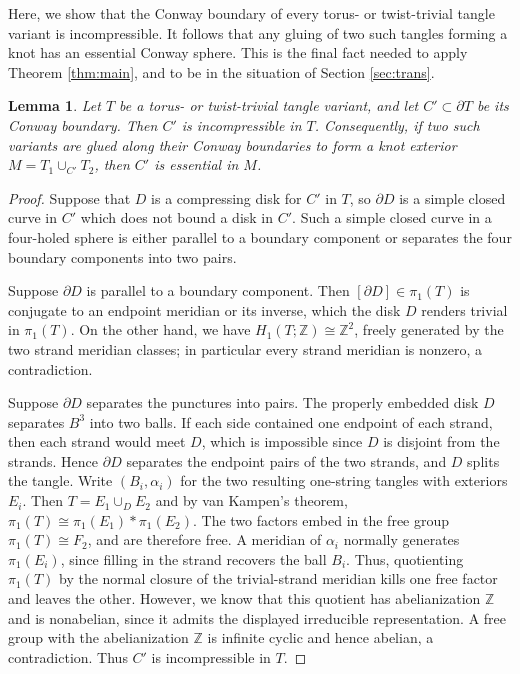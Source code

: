 \documentclass{article}
\theoremstyle{plain}
\theoremstyle{definition}
\theoremstyle{plain}
\theoremstyle{plain}
\theoremstyle{plain}
\newtheorem{lemma}[theorem]{Lemma}
\theoremstyle{remark}
\theoremstyle{remark}
\theoremstyle{plain}
\theoremstyle{plain}
\newcounter{main}
\theoremstyle{plain}
\theoremstyle{plain}
\begin{document}
Here, we show that the Conway boundary of every torus- or twist-trivial tangle variant is incompressible. It follows that any gluing of two such tangles forming a knot has an essential Conway sphere. This is the final fact needed to apply Theorem \ref{thm:main}, and to be in the situation of Section \ref{sec:trans}. 

\begin{lemma}\label{lma:essential}
Let $T$ be a torus- or twist-trivial tangle variant, and let $C' \subset \partial T$ be its Conway boundary. Then $C'$ is incompressible in $T$. Consequently, if two such variants are glued along their Conway boundaries to form a knot exterior $M = T_1 \cup_{C'}T_2$, then $C'$ is essential in $M$. 
\end{lemma}

\begin{proof}
Suppose that $D$ is a compressing disk for $C'$ in $T$, so $\partial D$ is a simple closed curve in $C'$ which does not bound a disk in $C'$. Such a simple closed curve in a four-holed sphere is either parallel to a boundary component or separates the four boundary components into two pairs. 

\medskip

Suppose $\partial D$ is parallel to a boundary component. Then $[\partial D] \in \pi_1(T)$ is conjugate to an endpoint meridian or its inverse, which the disk $D$ renders trivial in $\pi_1(T)$. On the other hand, we have $H_1(T; \mathbb{Z}) \cong \mathbb{Z}^2$, freely generated by the two strand meridian classes; in particular every strand meridian is nonzero, a contradiction. 

\medskip

Suppose $\partial D$ separates the punctures into pairs. The properly embedded disk $D$ separates $B^3$ into two balls. If each side contained one endpoint of each strand, then each strand would meet $D$, which is impossible since $D$ is disjoint from the strands. Hence $\partial D$ separates the endpoint pairs of the two strands, and $D$ splits the tangle. Write $(B_i, \alpha_i)$ for the two resulting one-string tangles with exteriors $E_i$. Then $T = E_1 \cup_DE_2$ and by van Kampen's theorem, $\pi_1(T) \cong \pi_1(E_1) * \pi_1(E_2)$. The two factors embed in the free group $\pi_1(T) \cong F_2$, and are therefore free. A meridian of $\alpha_i$ normally generates $\pi_1(E_i)$, since filling in the strand recovers the ball $B_i$. Thus, quotienting $\pi_1(T)$ by the normal closure of the trivial-strand meridian kills one free factor and leaves the other. However, we know that this quotient has abelianization $\mathbb Z$ and is nonabelian, since it admits the displayed irreducible representation. A free group with the abelianization $\mathbb Z$ is infinite cyclic and hence abelian, a contradiction. Thus $C'$ is incompressible in $T$.


\end{proof}
\end{document}
